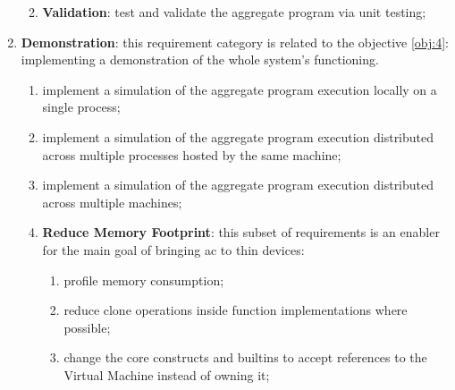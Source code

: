 \begin{enumerate}
\begin{enumerate}
\begin{enumerate}
                    \end{enumerate}
              \item \textbf{Validation}: test and validate the aggregate program via unit testing;
          \end{enumerate}
    \item \textbf{Demonstration}: this requirement category is related to the objective \ref{obj:4}: implementing a demonstration of the whole system's functioning.
          \begin{enumerate}
              \item implement a simulation of the aggregate program execution locally on a single process;
              \item implement a simulation of the aggregate program execution distributed across multiple processes hosted by the same machine;
              \item implement a simulation of the aggregate program execution distributed across multiple machines;
              \item \textbf{Reduce Memory Footprint}: this subset of requirements is an enabler for the main goal of bringing \ac{ac} to thin devices:
                    \begin{enumerate}
                        \item profile memory consumption;
                        \item reduce clone operations inside function implementations where possible;
                        \item change the core constructs and builtins to accept references to the Virtual Machine instead of owning it;
                    \end{enumerate}
          \end{enumerate}
\end{enumerate}

